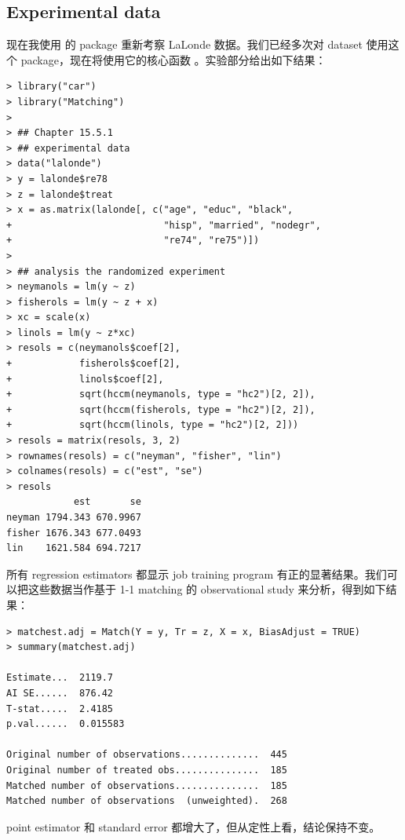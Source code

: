 \subsection{Experimental data}
现在我使用 \citet{sekhon2011multivariate} 的  package 重新考察 LaLonde 数据。我们已经多次对 dataset  使用这个 package，现在将使用它的核心函数 。实验部分给出如下结果：
\begin{lstlisting}
> library("car")
> library("Matching")
> 
> ## Chapter 15.5.1
> ## experimental data
> data("lalonde")
> y = lalonde$re78
> z = lalonde$treat
> x = as.matrix(lalonde[, c("age", "educ", "black",
+                           "hisp", "married", "nodegr",
+                           "re74", "re75")])
> 
> ## analysis the randomized experiment
> neymanols = lm(y ~ z)
> fisherols = lm(y ~ z + x)
> xc = scale(x)
> linols = lm(y ~ z*xc)
> resols = c(neymanols$coef[2],
+            fisherols$coef[2],
+            linols$coef[2],
+            sqrt(hccm(neymanols, type = "hc2")[2, 2]),
+            sqrt(hccm(fisherols, type = "hc2")[2, 2]),
+            sqrt(hccm(linols, type = "hc2")[2, 2]))
> resols = matrix(resols, 3, 2)
> rownames(resols) = c("neyman", "fisher", "lin")
> colnames(resols) = c("est", "se")
> resols 
            est       se
neyman 1794.343 670.9967
fisher 1676.343 677.0493
lin    1621.584 694.7217
\end{lstlisting} 
所有 regression estimators 都显示 job training program 有正的显著结果。我们可以把这些数据当作基于 1-1 matching 的 observational study 来分析，得到如下结果：
\begin{lstlisting}
> matchest.adj = Match(Y = y, Tr = z, X = x, BiasAdjust = TRUE)
> summary(matchest.adj)

Estimate...  2119.7 
AI SE......  876.42 
T-stat.....  2.4185 
p.val......  0.015583 

Original number of observations..............  445 
Original number of treated obs...............  185 
Matched number of observations...............  185 
Matched number of observations  (unweighted).  268
\end{lstlisting} 
point estimator 和 standard error 都增大了，但从定性上看，结论保持不变。


